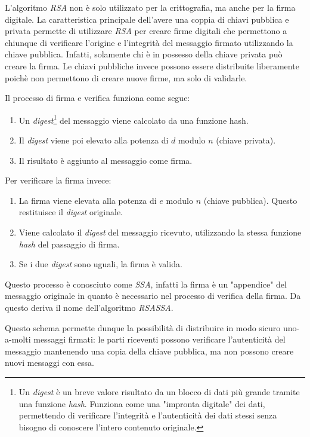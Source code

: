 L'algoritmo \emph{RSA} non è solo utilizzato per la crittografia, ma anche per la firma digitale.
La caratteristica principale dell'avere una coppia di chiavi pubblica e privata permette di utilizzare \emph{RSA} per creare firme digitali che permettono a chiunque di verificare l'origine e l'integrità del messaggio firmato utilizzando la chiave pubblica.
Infatti, solamente chi è in possesso della chiave privata può creare la firma.
Le chiavi pubbliche invece possono essere distribuite liberamente poichè non permettono di creare nuove firme, ma solo di validarle.

\noindent Il processo di firma e verifica funziona come segue:
\begin{enumerate}
	\item Un \emph{digest}\footnote{Un \emph{digest} è un breve valore risultato da un blocco di dati più grande tramite una funzione \emph{hash}. Funziona come una "impronta digitale" dei dati, permettendo di verificare l'integrità e l'autenticità dei dati stessi senza bisogno di conoscere l'intero contenuto originale.} del messaggio viene calcolato da una funzione hash.
	\item Il \emph{digest} viene poi elevato alla potenza di $d$ modulo $n$ (chiave privata).
	\item Il risultato è aggiunto al messaggio come firma.
\end{enumerate}
\noindent Per verificare la firma invece:
\begin{enumerate}
	\item La firma viene elevata alla potenza di $e$ modulo $n$ (chiave pubblica). Questo restituisce il \emph{digest} originale.
	\item Viene calcolato il \emph{digest} del messaggio ricevuto, utilizzando la stessa funzione \emph{hash} del passaggio di firma.
	\item Se i due \emph{digest} sono uguali, la firma è valida.
\end{enumerate}

Questo processo è conosciuto come \emph{\gls{SSA}}, infatti la firma è un "appendice" del messaggio originale in quanto è necessario nel processo di verifica della firma.
Da questo deriva il nome dell'algoritmo \emph{RSASSA}.

Questo schema permette dunque la possibilità di distribuire in modo sicuro uno-a-molti messaggi firmati: le parti riceventi possono verificare l'autenticità del messaggio mantenendo una copia della chiave pubblica, ma non possono creare nuovi messaggi con essa.


